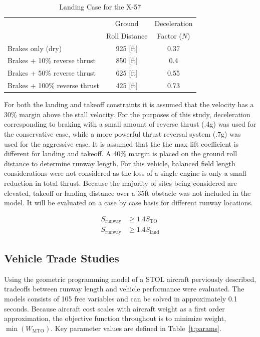 \documentclass[]{aiaa-tc}%
\begin{document}
\begin{table}[H]
    \centering
    \caption{Landing Case for the X-57}
    \label{t:landingdecel}
    \begin{tabular}{lcc}
    \toprule
    \toprule
                                    & Ground          & Deceleration \\ 
                                    & Roll Distance   & Factor ($N$)\\ \hline
    Brakes only (dry)               &  925 [ft]       & 0.37  \\
    Brakes + 10\% reverse thrust    &  850 [ft]       & 0.4   \\
    Brakes + 50\% reverse thrust    &  625 [ft]       & 0.55  \\
    Brakes + 100\% reverse thrust   &  425 [ft]       & 0.73  \\
    \bottomrule
\end{tabular}
\end{table}

For both the landing and takeoff constraints it is assumed that the velocity has a 30\% margin above the stall velocity\cite{ASTM3179}.
For the purposes of this study, deceleration corresponding to braking with a small amount of reverse thrust (.4g) was used for the conservative case, while a more powerful thrust reversal system (.7g) was used for the aggressive case. 
It is assumed that the the max lift coefficient is different for landing and takeoff.
A 40\% margin is placed on the ground roll distance to determine runway length\cite{PilotGuide}.  For this vehicle, balanced field length considerations were not considered as the loss of a single engine is only a small reduction in total thrust.  Because the majority of sites being considered are elevated, takeoff or landing distance over a 35ft obstacle was not included in the model.  It will be evaluated on a case by case basis for different runway locations.

\begin{align}
    S_{\mathrm{runway}} &\geq 1.4S_{\mathrm{TO}} \\
    S_{\mathrm{runway}} &\geq 1.4S_{\mathrm{land}} 
\end{align}

\subsection{Vehicle Trade Studies}

Using the geometric programming model of a STOL aircraft perviously described, tradeoffs between runway length and vehicle performance were evaluated.  The models consists of 105 free variables and can be solved in approximately 0.1 seconds. 
Because aircraft cost scales with aircraft weight as a first order approximation, the objective function throughout is to minimize weight, $\min{(W_{\mathrm{MTO}})}$. 
Key parameter values are defined in Table~\ref{t:params}.
\end{document}
